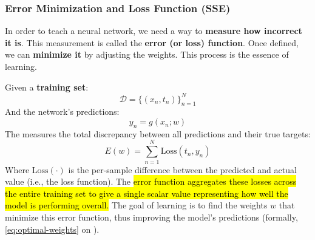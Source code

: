 \subsubsection{Error Minimization and Loss Function (SSE)}\label{sec:error-minimization-and-loss-function}

In order to teach a neural network, we need a way to \textbf{measure how incorrect it is}. This measurement is called the \textbf{error (or loss) function}. Once defined, we can \textbf{minimize it} by adjusting the weights. This process is the essence of learning.

\highspace
\begin{definitionbox}
    Given a \textbf{training set}:
    \begin{equation}
        \mathcal{D} = \Biggl\{\left(x_{n}, t_{n}\right)\Biggr\}_{n=1}^{N}
    \end{equation}
    And the network's predictions:
    \begin{equation}
        y_{n} = g\left(x_{n}; w\right)
    \end{equation}
    The  measures the total discrepancy between all predictions and their true targets:
    \begin{equation}
        E(w) = \displaystyle\sum_{n=1}^{N} \text{Loss}(t_{n}, y_{n})
    \end{equation}
    Where $\text{Loss}\left(\cdot\right)$ is the per-sample difference between the predicted and actual value (i.e., the loss function). The \hl{error function aggregates these losses across the entire training set to give a single scalar value representing how well the model is performing overall.} The goal of learning is to find the weights $w$ that minimize this error function, thus improving the model's predictions (formally, \autoref{eq:optimal-weights} on ).
\end{definitionbox}

